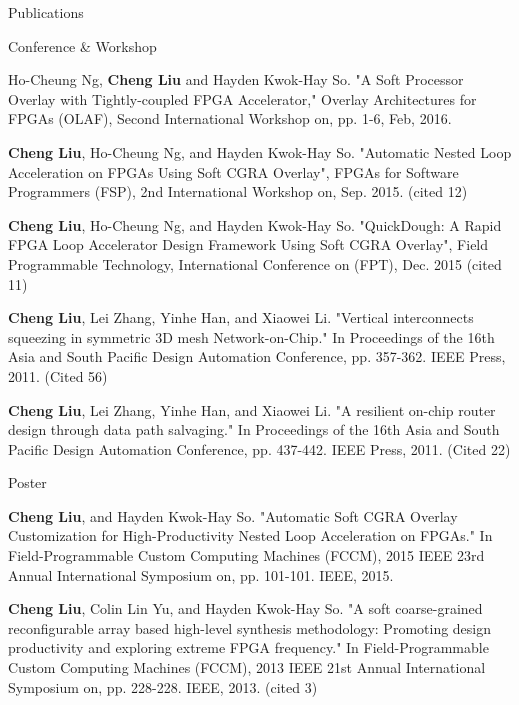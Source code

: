 \documentclass{resume} %
\begin{document}
\begin{rSection}{Publications}
    \begin{rSubsection} {Conference \& Workshop}{}{}{}
    \item Ho-Cheung Ng, \textbf{Cheng Liu} and Hayden Kwok-Hay So. "A Soft Processor Overlay with
        Tightly-coupled FPGA Accelerator," Overlay Architectures for FPGAs (OLAF), Second
        International Workshop on, pp. 1-6, Feb, 2016. 
    \item \textbf{Cheng Liu}, Ho-Cheung Ng, and Hayden Kwok-Hay So. "Automatic Nested Loop Acceleration on
        FPGAs Using Soft CGRA Overlay", FPGAs for Software Programmers (FSP), 2nd International
        Workshop on, Sep. 2015. (cited 12)
    \item \textbf{Cheng Liu}, Ho-Cheung Ng, and Hayden Kwok-Hay So. "QuickDough: A Rapid FPGA Loop
        Accelerator Design Framework Using Soft CGRA Overlay", Field Programmable Technology,
        International Conference on (FPT), Dec. 2015 (cited 11) 
    \item \textbf{Cheng Liu}, Lei Zhang, Yinhe Han, and Xiaowei Li. "Vertical interconnects squeezing in
        symmetric 3D mesh Network-on-Chip." In Proceedings of the 16th Asia and South Pacific Design
        Automation Conference, pp. 357-362. IEEE Press, 2011. (Cited 56)
    \item \textbf{Cheng Liu}, Lei Zhang, Yinhe Han, and Xiaowei Li. "A resilient on-chip router design
        through data path salvaging." In Proceedings of the 16th Asia and South Pacific Design
        Automation Conference, pp. 437-442. IEEE Press, 2011. (Cited 22)
    \end{rSubsection}

    \begin{rSubsection} {Poster}{}{}{}
    \item \textbf{Cheng Liu}, and Hayden Kwok-Hay So. "Automatic Soft CGRA Overlay Customization for
        High-Productivity Nested Loop Acceleration on FPGAs." In Field-Programmable Custom Computing
        Machines (FCCM), 2015 IEEE 23rd Annual International Symposium on, pp. 101-101. IEEE, 2015.
    \item \textbf{Cheng Liu}, Colin Lin Yu, and Hayden Kwok-Hay So. "A soft coarse-grained reconfigurable
        array based high-level synthesis methodology: Promoting design productivity and exploring
        extreme FPGA frequency." In Field-Programmable Custom Computing Machines (FCCM), 2013 IEEE
        21st Annual International Symposium on, pp. 228-228. IEEE, 2013. (cited 3)
    \end{rSubsection}

\end{rSection}
\end{document}
